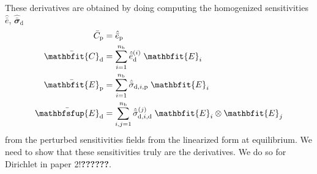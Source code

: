 \documentclass[12pt,a4paper]{article}
\renewcommand{\ts}[1]{\mathbfit{#1}}
\renewcommand{\tf}[1]{\mathbfsfup{#1}}
\renewcommand{\dev}{\mathrm{d}}
\newcommand{\ded}{\mathrm{d}}
\newcommand{\dep}{\mathrm{p}}
\begin{document}
These derivatives are obtained by doing computing the homogenized sensitivities $\hat{\bar{e}}$, $\hat{\bar{\ts\sigma}}_\dev$
\begin{align}
 \bar{    C}_\dep &= \hat{\bar{e}}_{\dep}\\
 \bar{\ts C}_\ded &= \sum_{i=1}^{n_\mathrm{b}} \hat{\bar{e}}_{\ded}^{(i)}\;\ts E_i\\
 \bar{\ts E}_\dep &= \sum_{i=1}^{n_\mathrm{b}} \hat{\bar{\sigma}}_{\dev,i,\dep}\;\ts E_i\\
 \bar{\tf E}_\ded &= \sum_{i,j=1}^{n_\mathrm{b}} \hat{\bar{\sigma}}_{\dev,i,\ded}^{(j)}\;\ts E_i \outerp \ts E_j
\end{align}
from the perturbed sensitivities fields from the linearized form at equilibrium.
We need to show that these sensitivities truly are the derivatives.
We do so for Dirichlet in paper 2!\textbf{??????}.
\end{document}
